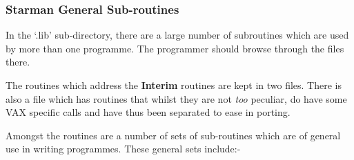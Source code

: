 \subsubsection{Starman General Sub-routines}

In the `.lib' sub-directory, there are a large number of subroutines
which are used by more than one programme. The programmer should
browse through the files there. 

The routines which address the {\bf Interim} routines are kept in two
files. There is also a file which has routines that whilst they are
not {\em too} peculiar, do have some VAX specific calls and have
thus been separated to ease in porting.

Amongst the routines are
a number of sets of sub-routines which are of general use in
writing programmes. These general sets include:-

